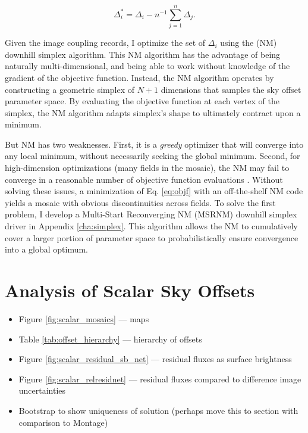 \documentclass[iop]{emulateapj}
\begin{document}
\begin{equation}
    \Delta_i^* = \Delta_i - n^{-1}\sum_{j=1}^n \Delta_j.
    \label{eq:netzero}
\end{equation}

Given the image coupling records, I optimize the set of $\Delta_i$ using the \cite{Nelder:1965} (NM) downhill simplex algorithm. This NM algorithm has the advantage of being naturally multi-dimensional, and being able to work without knowledge of the gradient of the objective function. Instead, the NM algorithm operates by constructing a geometric simplex of $N+1$ dimensions that samples the sky offset parameter space. By evaluating the objective function at each vertex of the simplex, the NM algorithm adapts simplex's shape to ultimately contract upon a minimum.

But NM has two weaknesses. First, it is a \emph{greedy} optimizer that will converge into any local minimum, without necessarily seeking the global minimum. Second, for high-dimension optimizations (many fields in the mosaic), the NM may fail to converge in a reasonable number of objective function evaluations \citep{Neumann:2006}. Without solving these issues, a minimization of Eq. \ref{eq:objf} with an off-the-shelf NM code yields a mosaic with obvious discontinuities across fields. To solve the first problem, I develop a Multi-Start Reconverging NM (MSRNM) downhill simplex driver in Appendix \ref{cha:simplex}. This algorithm allows the NM to cumulatively cover a larger portion of parameter space to probabilistically ensure convergence into a global optimum.

\section{Analysis of Scalar Sky Offsets}
\label{sec:scalaranalysis}

\begin{itemize}
\item Figure \ref{fig:scalar_mosaics} --- maps
\item Table \ref{tab:offset_hierarchy} --- hierarchy of offsets
\item Figure \ref{fig:scalar_residual_sb_net} --- residual fluxes as surface brightness
\item Figure \ref{fig:scalar_relresidnet} --- residual fluxes compared to difference image uncertainties
\item Bootstrap to show uniqueness of solution (perhaps move this to section with comparison to Montage)
\end{itemize}
\end{document}
